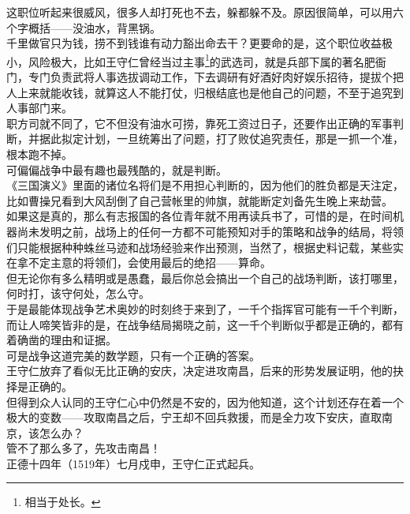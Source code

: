 \begin{multicols}{\theparacolNo}
这职位听起来很威风，很多人却打死也不去，躲都躲不及。原因很简单，可以用六个字概括——没油水，背黑锅。\\

千里做官只为钱，捞不到钱谁有动力豁出命去干？更要命的是，这个职位收益极小，风险极大，比如王守仁曾经当过主事\footnote{相当于处长。}的武选司，就是兵部下属的著名肥衙门，专门负责武将人事选拔调动工作，下去调研有好酒好肉好娱乐招待，提拔个把人上来就能收钱，就算这人不能打仗，归根结底也是他自己的问题，不至于追究到人事部门来。\\

职方司就不同了，它不但没有油水可捞，靠死工资过日子，还要作出正确的军事判断，并据此拟定计划，一旦统筹出了问题，打了败仗追究责任，那是一抓一个准，根本跑不掉。\\

可偏偏战争中最有趣也最残酷的，就是判断。\\

《三国演义》里面的诸位名将们是不用担心判断的，因为他们的胜负都是天注定，比如曹操兄看到大风刮倒了自己营帐里的帅旗，就能断定刘备先生晚上来劫营。\\

如果这是真的，那么有志报国的各位青年就不用再读兵书了，可惜的是，在时间机器尚未发明之前，战场上的任何一方都不可能预知对手的策略和战争的结局，将领们只能根据种种蛛丝马迹和战场经验来作出预测，当然了，根据史料记载，某些实在拿不定主意的将领们，会使用最后的绝招——算命。\\

但无论你有多么精明或是愚蠢，最后你总会搞出一个自己的战场判断，该打哪里，何时打，该守何处，怎么守。\\

于是最能体现战争艺术奥妙的时刻终于来到了，一千个指挥官可能有一千个判断，而让人啼笑皆非的是，在战争结局揭晓之前，这一千个判断似乎都是正确的，都有着确凿的理由和证据。\\

可是战争这道完美的数学题，只有一个正确的答案。\\

王守仁放弃了看似无比正确的安庆，决定进攻南昌，后来的形势发展证明，他的抉择是正确的。\\

但得到众人认同的王守仁心中仍然是不安的，因为他知道，这个计划还存在着一个极大的变数——攻取南昌之后，宁王却不回兵救援，而是全力攻下安庆，直取南京，该怎么办？\\

管不了那么多了，先攻击南昌！\\

正德十四年（1519年）七月戍申，王守仁正式起兵。\\


\end{multicols}
